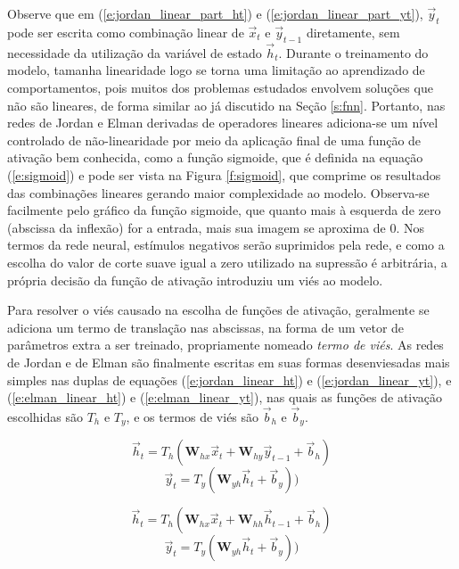       Observe que em (\ref{e:jordan_linear_part_ht}) e (\ref{e:jordan_linear_part_yt}), $\vec{y}_t$ pode ser escrita como combinação linear de $\vec{x}_t$ e $\vec{y}_{t-1}$ diretamente, sem necessidade da utilização da variável de estado $\vec{h}_t$. Durante o treinamento do modelo, tamanha linearidade logo se torna uma limitação ao aprendizado de comportamentos, pois muitos dos problemas estudados envolvem soluções que não são lineares, de forma similar ao já discutido na Seção \ref{s:fnn}. Portanto, nas redes de Jordan e Elman derivadas de operadores lineares adiciona-se um nível controlado de não-linearidade por meio da aplicação final de uma função de ativação bem conhecida, como a função sigmoide, que é definida na equação (\ref{e:sigmoid}) e pode ser vista na Figura \ref{f:sigmoid}, que comprime os resultados das combinações lineares gerando maior complexidade ao modelo. Observa-se facilmente pelo gráfico da função sigmoide, que quanto mais à esquerda de zero (abscissa da inflexão) for a entrada, mais sua imagem se aproxima de 0. Nos termos da rede neural, estímulos negativos serão suprimidos pela rede, e como a escolha do valor de corte suave igual a zero utilizado na supressão é arbitrária, a própria decisão da função de ativação introduziu um viés ao modelo.

      Para resolver o viés causado na escolha de funções de ativação, geralmente se adiciona um termo de translação nas abscissas, na forma de um vetor de parâmetros extra a ser treinado, propriamente nomeado \textit{termo de viés}. As redes de Jordan e de Elman são finalmente escritas em suas formas desenviesadas mais simples nas duplas de equações (\ref{e:jordan_linear_ht}) e (\ref{e:jordan_linear_yt}), e (\ref{e:elman_linear_ht}) e (\ref{e:elman_linear_yt}), nas quais as funções de ativação escolhidas são $T_h$ e $T_y$, e os termos de viés são $\vec{b}_h$ e $\vec{b}_y$.

      \begin{equation} \label{e:jordan_linear_ht}
        \vec{h}_t = T_h(\boldsymbol{W}_{hx} \vec{x}_t + \boldsymbol{W}_{hy} \vec{y}_{t-1} + \vec{b}_h)
      \end{equation}
      \begin{equation} \label{e:jordan_linear_yt}
        \vec{y}_t = T_y(\boldsymbol{W}_{yh} \vec{h}_t + \vec{b}_y))
      \end{equation}

      \begin{equation} \label{e:elman_linear_ht}
        \vec{h}_t = T_h(\boldsymbol{W}_{hx} \vec{x}_t + \boldsymbol{W}_{hh} \vec{h}_{t-1} + \vec{b}_h)
      \end{equation}
      \begin{equation} \label{e:elman_linear_yt}
        \vec{y}_t = T_y(\boldsymbol{W}_{yh} \vec{h}_t + \vec{b}_y))
      \end{equation}

